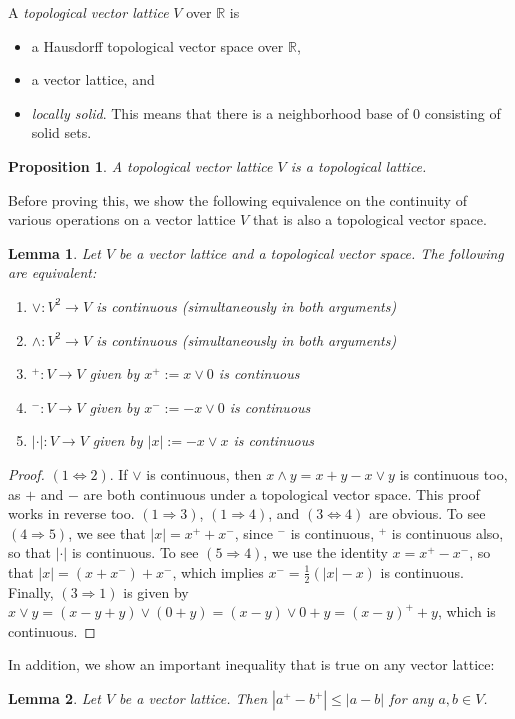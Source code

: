 \documentclass[12pt]{article}
\newtheorem{prop}{Proposition}
\newtheorem{lem}{Lemma}
\begin{document}
A \emph{topological vector lattice} $V$ over $\mathbb{R}$ is
\begin{itemize}
\item a Hausdorff topological vector space over $\mathbb{R}$,
\item a vector lattice, and
\item \emph{locally solid}.  This means that there is a neighborhood base of $0$ consisting of solid sets.
\end{itemize}

\begin{prop}  A topological vector lattice $V$ is a topological lattice.\end{prop}

Before proving this, we show the following equivalence on the continuity of various operations on a vector lattice $V$ that is also a topological vector space.  
\begin{lem} Let $V$ be a vector lattice and a topological vector space.  The following are equivalent:
\begin{enumerate}
\item $\vee:V^2\to V$ is continuous (simultaneously in both arguments)
\item $\wedge:V^2\to V$ is continuous (simultaneously in both arguments)
\item $^+:V\to V$ given by $x^+:=x\vee 0$ is continuous
\item $^-:V\to V$ given by $x^-:=-x\vee 0$ is continuous
\item $|\cdot|:V\to V$ given by $|x|:=-x\vee x$ is continuous
\end{enumerate}
\end{lem}
\begin{proof}
$(1\Leftrightarrow 2)$.  If $\vee$ is continuous, then $x\wedge y=x+y-x\vee y$ is continuous too, as $+$ and $-$ are both continuous under a topological vector space.  This proof works in reverse too.  $(1\Rightarrow 3)$, $(1\Rightarrow 4)$, and $(3\Leftrightarrow 4)$ are obvious.  To see $(4\Rightarrow 5)$, we see that $|x|=x^++x^-$, since $^-$ is continuous, $^+$ is continuous also, so that $|\cdot|$ is continuous.  To see $(5\Rightarrow 4)$, we use the identity $x=x^+-x^-$, so that $|x|=(x+x^-)+x^-$, which implies $x^-=\frac{1}{2}(|x|-x)$ is continuous.  Finally, $(3\Rightarrow 1)$ is given by $x\vee y=(x-y+y)\vee (0+y)=(x-y)\vee 0+y=(x-y)^++y$, which is continuous.
\end{proof}
In addition, we show an important inequality that is true on any vector lattice:
\begin{lem} Let $V$ be a vector lattice.  Then $|a^+-b^+|\le |a-b|$ for any $a,b\in V$. \end{lem}
\end{document}
